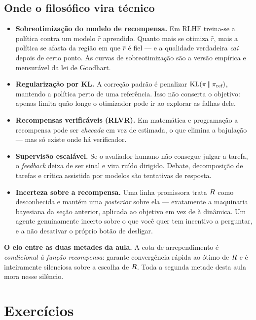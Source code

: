 \documentclass[11pt]{article}
\begin{document}
\subsection*{Onde o filosófico vira técnico}

\begin{itemize}
  \item \textbf{Sobreotimização do modelo de recompensa.} Em RLHF treina-se a
        política contra um modelo $\hat r$ aprendido. Quanto mais se otimiza
        $\hat r$, mais a política se afasta da região em que $\hat r$ é fiel ---
        e a qualidade verdadeira \emph{cai} depois de certo ponto. As curvas de
        sobreotimização são a versão empírica e mensurável da lei de Goodhart.
  \item \textbf{Regularização por KL.} A correção padrão é penalizar
        $\mathrm{KL}(\pi\,\|\,\pi_{\text{ref}})$, mantendo a política perto de
        uma referência. Isso não conserta o objetivo: apenas limita quão longe o
        otimizador pode ir ao explorar as falhas dele.
  \item \textbf{Recompensas verificáveis (RLVR).} Em matemática e programação a
        recompensa pode ser \emph{checada} em vez de estimada, o que elimina a
        bajulação --- mas só existe onde há verificador.
  \item \textbf{Supervisão escalável.} Se o avaliador humano não consegue julgar
        a tarefa, o \emph{feedback} deixa de ser sinal e vira ruído dirigido.
        Debate, decomposição de tarefas e crítica assistida por modelos são
        tentativas de resposta.
  \item \textbf{Incerteza sobre a recompensa.} Uma linha promissora trata $R$
        como desconhecida e mantém uma \emph{posterior} sobre ela --- exatamente
        a maquinaria bayesiana da seção anterior, aplicada ao objetivo em vez de
        à dinâmica. Um agente genuinamente incerto sobre o que você quer tem
        incentivo a perguntar, e a não desativar o próprio botão de desligar.
\end{itemize}

\begin{ideiabox}
\textbf{O elo entre as duas metades da aula.} A cota de arrependimento é
\emph{condicional à função recompensa}: garante convergência rápida ao ótimo de
$R$ e é inteiramente silenciosa sobre a escolha de $R$. Toda a segunda
metade desta aula mora nesse silêncio.
\end{ideiabox}

\section{Exercícios}
\end{document}
